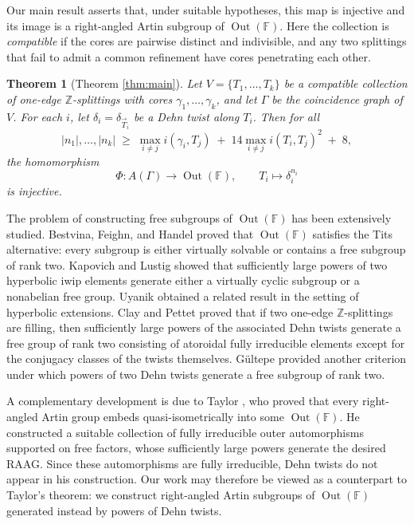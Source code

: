 \documentclass[12pt,a4paper]{amsart}
\numberwithin{equation}{section}
\DeclareMathOperator{\Out}{Out}
\newcommand{\FF}{\mathbb{F}}
\theoremstyle{plain}
\newtheorem{theorem}{Theorem}[section]
\theoremstyle{definition}
\theoremstyle{remark}
\begin{document}
Our main result asserts that, under suitable hypotheses, this map is injective and its image is a right-angled Artin subgroup of $\Out(\mathbb{F})$.
Here the collection is \emph{compatible} if the cores are pairwise distinct and indivisible, and any two splittings that fail to admit a common refinement have cores penetrating each other.

\begin{theorem}[Theorem \ref{thm:main}] \label{thm:1}
    Let $V = \{ T_1, \dots, T_k \}$ be a compatible collection of one-edge $\mathbb{Z}$-splittings with cores $\gamma_1, \dots, \gamma_k$, and let $\Gamma$ be the coincidence graph of $V$.
    For each $i$, let $\delta_i = \delta_{\vec{T}_i}$ be a Dehn twist along $T_i$.
    Then for all
    \[
        \lvert n_1 \rvert, \dots, \lvert n_k \rvert
        \;\ge\;
        \max_{i \ne j} i(\gamma_i, T_j)
        \;+\;
        14 \max_{i \ne j} i(T_i, T_j)^2
        \;+\; 8,
    \]
    the homomorphism
    \[
        \Phi \colon A(\Gamma) \longrightarrow \Out(\FF), \qquad T_i \longmapsto \delta_i^{n_i}
    \]
    is injective.
\end{theorem}

The problem of constructing free subgroups of $\Out(\mathbb{F})$ has been extensively studied.  
Bestvina, Feighn, and Handel \cite{MR1765705} proved that $\Out(\mathbb{F})$ satisfies the Tits alternative: every subgroup is either virtually solvable or contains a free subgroup of rank two.  
Kapovich and Lustig \cite{MR2652906} showed that sufficiently large powers of two hyperbolic iwip elements generate either a virtually cyclic subgroup or a nonabelian free group.  
Uyanik \cite{MR3954286} obtained a related result in the setting of hyperbolic extensions.  
Clay and Pettet \cite{MR2720227} proved that if two one-edge $\mathbb{Z}$-splittings are filling, then sufficiently large powers of the associated Dehn twists generate a free group of rank two consisting of atoroidal fully irreducible elements except for the conjugacy classes of the twists themselves.  
G\"ultepe \cite{MR3677931} provided another criterion under which powers of two Dehn twists generate a free subgroup of rank two.

A complementary development is due to Taylor \cite{MR3343354}, who proved that every right-angled Artin group embeds quasi-isometrically into some $\Out(\mathbb{F})$.  
He constructed a suitable collection of fully irreducible outer automorphisms supported on free factors, whose sufficiently large powers generate the desired RAAG.  
Since these automorphisms are fully irreducible, Dehn twists do not appear in his construction.  
Our work may therefore be viewed as a counterpart to Taylor's theorem: we construct right-angled Artin subgroups of $\Out(\mathbb{F})$ generated instead by powers of Dehn twists.
\end{document}
